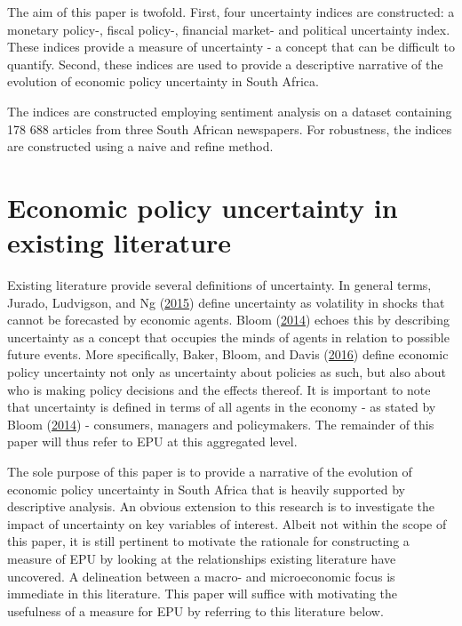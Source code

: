 \documentclass[11pt,preprint, authoryear]{elsarticle}
\numberwithin{equation}{section}
\numberwithin{figure}{section}
\numberwithin{table}{section}
\begin{document}
The aim of this paper is twofold. First, four uncertainty indices are
constructed: a monetary policy-, fiscal policy-, financial market- and
political uncertainty index. These indices provide a measure of
uncertainty - a concept that can be difficult to quantify. Second, these
indices are used to provide a descriptive narrative of the evolution of
economic policy uncertainty in South Africa.

The indices are constructed employing sentiment analysis on a dataset
containing 178 688 articles from three South African newspapers. For
robustness, the indices are constructed using a naive and refine method.

\section{\texorpdfstring{Economic policy uncertainty in existing
literature
\label{sec_litreview}}{Economic policy uncertainty in existing literature }}\label{economic-policy-uncertainty-in-existing-literature}

Existing literature provide several definitions of uncertainty. In
general terms, Jurado, Ludvigson, and Ng
(\protect\hyperlink{ref-Jurado2015}{2015}) define uncertainty as
volatility in shocks that cannot be forecasted by economic agents. Bloom
(\protect\hyperlink{ref-Bloom2014}{2014}) echoes this by describing
uncertainty as a concept that occupies the minds of agents in relation
to possible future events. More specifically, Baker, Bloom, and Davis
(\protect\hyperlink{ref-Baker2016}{2016}) define economic policy
uncertainty not only as uncertainty about policies as such, but also
about who is making policy decisions and the effects thereof. It is
important to note that uncertainty is defined in terms of all agents in
the economy - as stated by Bloom
(\protect\hyperlink{ref-Bloom2014}{2014}) - consumers, managers and
policymakers. The remainder of this paper will thus refer to EPU at this
aggregated level.

The sole purpose of this paper is to provide a narrative of the
evolution of economic policy uncertainty in South Africa that is heavily
supported by descriptive analysis. An obvious extension to this research
is to investigate the impact of uncertainty on key variables of
interest. Albeit not within the scope of this paper, it is still
pertinent to motivate the rationale for constructing a measure of EPU by
looking at the relationships existing literature have uncovered. A
delineation between a macro- and microeconomic focus is immediate in
this literature. This paper will suffice with motivating the usefulness
of a measure for EPU by referring to this literature below.
\end{document}
